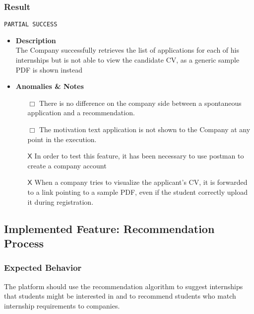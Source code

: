 \subsubsection{Result} 
\verb|PARTIAL SUCCESS|
\begin{itemize}
    \item \textbf{\color{titleColor} Description} \\The Company successfully retrieves the list of applications for each of his internships but is not able to view the candidate CV, as a generic sample PDF is shown instead 
    \item \textbf{\color{titleColor} Anomalies \& Notes}
    \begin{itemize}
        \item [{\color{titleColor}\(\Box \)}] There is no difference on the company side between a spontaneous application and a recommendation.
        \item [{\color{titleColor}\(\Box \)}] The motivation text application is not shown to the Company at any point in the execution.
        \item [{\color{titleColor}\(\mathsf{X}\)}] In order to test this feature, it has been necessary to use postman to create a company account
        \item [{\color{titleColor}\(\mathsf{X}\)}] When a company tries to visualize the applicant's CV, it is forwarded to a link pointing to a sample PDF, even if the student correctly upload it during registration.
    \end{itemize}
\end{itemize}


\subsection{Implemented Feature:  Recommendation Process}
\subsubsection{Expected Behavior}
The platform should use the recommendation algorithm to suggest internships that students might be interested in and to recommend students who match internship requirements to companies.
